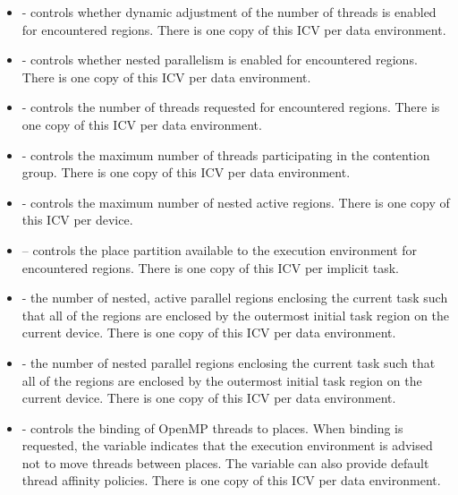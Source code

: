 \begin{itemize}
\item {} - controls whether dynamic adjustment of the number of threads is enabled 
for encountered  regions. There is one copy of this ICV per data 
environment. 

\item {} - controls whether nested parallelism is enabled for encountered  
regions. There is one copy of this ICV per data environment. 

\item {} - controls the number of threads requested for encountered  
regions. There is one copy of this ICV per data environment. 

\item {} - controls the maximum number of threads participating in the 
contention group. There is one copy of this ICV per data environment. 

\item {} - controls the maximum number of nested active  
regions. There is one copy of this ICV per device.

\item {} – controls the place partition available to the execution 
environment for encountered  regions. There is one copy of this ICV per 
implicit task.

\item {} - the number of nested, active parallel regions enclosing the current 
task such that all of the  regions are enclosed by the outermost initial task 
region on the current device. There is one copy of this ICV per data environment.

\item {} - the number of nested parallel regions enclosing the current task such that 
all of the  regions are enclosed by the outermost initial task region on the 
current device. There is one copy of this ICV per data environment. 

\item {} - controls the binding of OpenMP threads to places. When binding is 
requested, the variable indicates that the execution environment is advised not to 
move threads between places. The variable can also provide default thread affinity 
policies. There is one copy of this ICV per data environment. 
\end{itemize}

